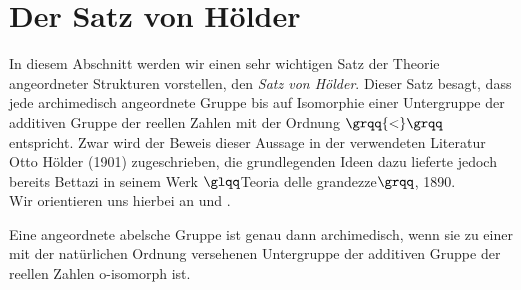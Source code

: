 \section{Der Satz von Hölder}
In diesem Abschnitt werden wir einen sehr wichtigen Satz der Theorie angeordneter Strukturen vorstellen, den \textit{Satz von Hölder}. Dieser Satz besagt, dass jede archimedisch angeordnete Gruppe bis auf Isomorphie einer Untergruppe der additiven Gruppe der reellen Zahlen mit der Ordnung $\grqq{<}\grqq$ entspricht. Zwar wird der Beweis dieser Aussage in der verwendeten Literatur Otto Hölder (1901)\cite{hoelder1901} zugeschrieben, die grundlegenden Ideen dazu lieferte jedoch bereits Bettazi in seinem Werk $\glqq$Teoria delle grandezze$\grqq$, 1890\cite[S. 578]{Lueneburg08}.\\
Wir orientieren uns hierbei an \cite{hoelder1901} und \cite{priesscrampe83}. 
\begin{satz}\label{aga} %
Eine angeordnete abelsche Gruppe ist genau dann archimedisch, wenn sie zu einer mit der natürlichen Ordnung versehenen Untergruppe der additiven Gruppe der reellen Zahlen o-isomorph ist.
\end{satz}
%
%

